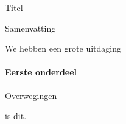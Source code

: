 \begin{voorstel}{Titel}

\begin{samenvatting}
Samenvatting
\end{samenvatting}

\begin{uitdaging}
We hebben een grote uitdaging
\end{uitdaging}

\begin{overwegingen}
\paragraph{Eerste onderdeel} Overwegingen
\end{overwegingen}

\begin{aanbevelingen}
 is dit.
\end{aanbevelingen}

\end{voorstel}
